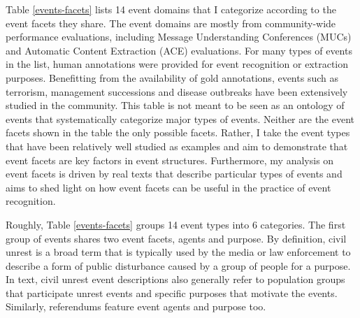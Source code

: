 


Table \ref{events-facets} lists 14 event domains that I categorize according to 
the event facets they share. The event domains are mostly from 
community-wide performance evaluations, including 
Message Understanding Conferences (MUCs) and 
Automatic Content Extraction (ACE) evaluations. 
For many types of events in the list, human annotations were provided for event 
recognition or extraction purposes.
Benefitting from the availability of gold annotations, 
events such as terrorism, management successions and 
disease outbreaks have been extensively studied in the community.
This table is not meant to be seen as an ontology of events that 
systematically categorize major types of events. 
Neither are the event facets 
shown in the table 
the only possible facets. 
Rather, I take the event types that have been relatively well studied 
as examples and aim to demonstrate that event facets are key factors in  
event structures. 
Furthermore, my analysis on event facets is driven by real texts that 
describe particular types of events and aims to 
shed light on how event facets can be useful 
in the practice of event recognition.   

Roughly, Table \ref{events-facets} groups 14 event types into 6 categories.
The first group of events shares two event facets, agents and purpose. 
By definition, civil unrest is a broad term that is typically used 
by the media or law enforcement to describe a 
form of public disturbance caused by a
group of people for a purpose.
In text, civil unrest event descriptions also generally refer to  
population groups that participate unrest events and specific purposes 
that motivate the events. 
Similarly, referendums feature event agents and purpose too. 

